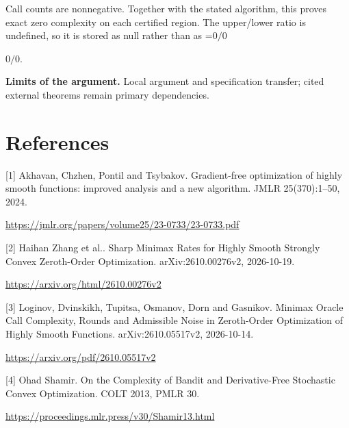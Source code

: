 \documentclass[10pt,a4paper]{article}
\newcommand{\AtlasMath}[1]{\par\begingroup\centering\setbox0=\hbox{$\displaystyle #1$}\ifdim\wd0>1.4\linewidth\typeout{ATLAS WIDE FORMULA: \the\wd0}\fi\ifdim\wd0>\linewidth\resizebox{\linewidth}{!}{\box0}\else\box0\fi\par\endgroup}
\newcommand{\AtlasInlineMath}[1]{\begingroup\setbox0=\hbox{$#1$}\ifdim\wd0>.4\linewidth\endgroup\AtlasMath{#1}\else\endgroup$#1$\fi}
\begin{document}
Call counts are nonnegative. Together with the stated algorithm, this proves exact zero complexity on each certified region. The upper/lower ratio is undefined, so it is stored as null rather than as \AtlasInlineMath{0/0}.

\textbf{Limits of the argument.} Local argument and specification transfer; cited external theorems remain primary dependencies.

\section{References}
[1] Akhavan, Chzhen, Pontil and Tsybakov. Gradient-free optimization of highly smooth functions: improved analysis and a new algorithm. JMLR 25(370):1--50, 2024.

\url{https://jmlr.org/papers/volume25/23-0733/23-0733.pdf}

[2] Haihan Zhang et al.. Sharp Minimax Rates for Highly Smooth Strongly Convex Zeroth-Order Optimization. arXiv:2610.00276v2, 2026-10-19.

\url{https://arxiv.org/html/2610.00276v2}

[3] Loginov, Dvinskikh, Tupitsa, Osmanov, Dorn and Gasnikov. Minimax Oracle Call Complexity, Rounds and Admissible Noise in Zeroth-Order Optimization of Highly Smooth Functions. arXiv:2610.05517v2, 2026-10-14.

\url{https://arxiv.org/pdf/2610.05517v2}

[4] Ohad Shamir. On the Complexity of Bandit and Derivative-Free Stochastic Convex Optimization. COLT 2013, PMLR 30.

\url{https://proceedings.mlr.press/v30/Shamir13.html}
\end{document}
